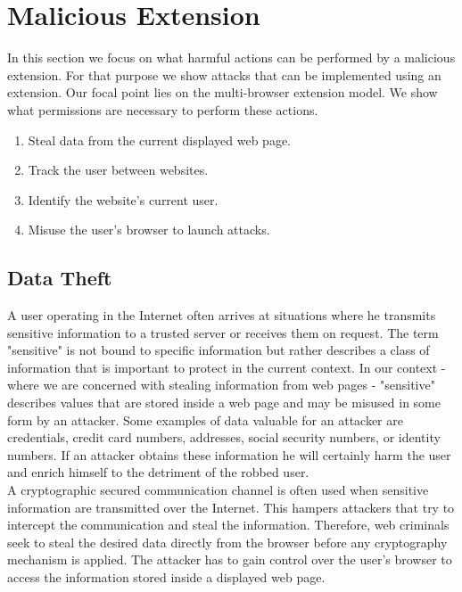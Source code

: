 \documentclass[article,colorback,accentcolor=tud9c,type=bsc]{tudthesis}
\let\stdsection\section
\let\stdsubsection\subsection
\renewcommand\section{\newpage\stdsection}
\renewcommand\subsection{\newpage\stdsubsection}
\begin{document}
\section{Malicious Extension}

	In this section we focus on what harmful actions can be performed by a malicious extension. For that purpose we show attacks that can be implemented using an extension. Our focal point lies on the multi-browser extension model. We show what permissions are necessary to perform these actions. \\ 
	
	\begin{enumerate}
		\item Steal data from the current displayed web page.
		\item Track the user between websites.
		\item Identify the website's current user. 
		\item Misuse the user's browser to launch attacks.
	\end{enumerate} 

\subsection{Data Theft}	
	
	A user operating in the Internet often arrives at situations where he transmits sensitive information to a trusted server or receives them on request. The term "sensitive" is not bound to specific information but rather describes a class of information that is important to protect in the current context. In our context - where we are concerned with stealing information from web pages - "sensitive" describes values that are stored inside a web page and may be misused in some form by an attacker. Some examples of data valuable for an attacker are credentials, credit card numbers, addresses, social security numbers, or identity numbers. If an attacker obtains these information he will certainly harm the user and enrich himself to the detriment of the robbed user. \\
	
	A cryptographic secured communication channel is often used when sensitive information are transmitted over the Internet. This hampers attackers that try to intercept the communication and steal the information. Therefore, web criminals seek to steal the desired data directly from the browser before any cryptography mechanism is applied. The attacker has to gain control over the user's browser to access the information stored inside a displayed web page. \\
	
\end{document}
